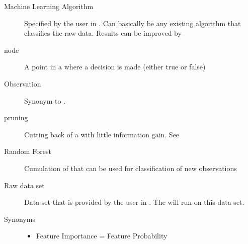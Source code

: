 \documentclass[letterpaper,10pt,english]{sphinxmanual}
\begin{document}
\begin{description}
\item[{Machine Learning Algorithm}] \leavevmode{}\label{\detokenize{Overview:term-machine-learning-algorithm}}
Specified by the user in {\hyperref[\detokenize{Generate_Database:compute}]{}}.
Can basically be any existing algorithm that classifies the raw data.
Results can be improved by {\hyperref[\detokenize{Overview:term-forestfire}]{}}

\item[{node}] \leavevmode{}\label{\detokenize{Overview:term-node}}
A point in a {\hyperref[\detokenize{Overview:term-decision-tree}]{}} where a decision is made (either true or false)

\item[{Observation}] \leavevmode{}\label{\detokenize{Overview:term-observation}}
Synonym to {\hyperref[\detokenize{Overview:term-feature-set}]{}}.

\item[{pruning}] \leavevmode{}\label{\detokenize{Overview:term-pruning}}
Cutting back {\hyperref[\detokenize{Overview:term-branch}]{}} of a {\hyperref[\detokenize{Overview:term-decision-tree}]{}} with little information gain.
See {\hyperref[\detokenize{DT:prune}]{}}

\item[{Random Forest}] \leavevmode{}\label{\detokenize{Overview:term-random-forest}}
Cumulation of {\hyperref[\detokenize{Overview:term-decision-tree}]{}} that can be used for classification of new observations

\item[{Raw data set}] \leavevmode{}\label{\detokenize{Overview:term-raw-data-set}}
Data set that is provided by the user in {\hyperref[\detokenize{Importing_Data:import-data}]{}}.
The {\hyperref[\detokenize{Overview:mla}]{}} will run on this data set.

\item[{Synonyms}] \leavevmode{}\label{\detokenize{Overview:term-synonyms}}\begin{itemize}
\item {} 
Feature Importance = Feature Probability

\end{itemize}

\end{description}
\end{document}

